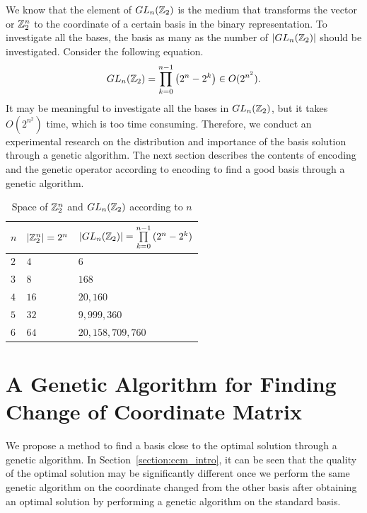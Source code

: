 We know that the element of $ GL_n(\mathbb{Z}_2) $ is the medium that transforms the vector or $ \mathbb{Z}_2^n $ to the coordinate of a certain basis in the binary representation.
To investigate all the bases, the basis as many as the number of $ \left| GL_n(\mathbb{Z}_2) \right| $ should be investigated.
Consider the following equation.
\[ GL_n(\mathbb{Z}_2) = \prod\limits_{k=0}^{n-1} \left( 2^n - 2^k \right) \in O(2^{n^2}). \]
It may be meaningful to investigate all the bases in $ GL_n(\mathbb{Z}_2) $, but it takes $ O(2^{n^2}) $ time, which is too time consuming.
Therefore, we conduct an experimental research on the distribution and importance of the basis solution through a genetic algorithm.
The next section describes the contents of encoding and the genetic operator according to encoding to find a good basis through a genetic algorithm.

\begin{table}[H]
  \caption{Space of $ \mathbb{Z}_2^n $ and $ GL_n(\mathbb{Z}_2) $ according to $ n $}
  \label{tab:space}
  \begin{tabularx}{0.45\textwidth}{C{0.05\textwidth} R{0.1\textwidth} Z}
    \toprule
    $ n $  &  $ | \mathbb{Z}_2^n | = 2^n $  &  $ | GL_n(\mathbb{Z}_2) | = \prod\limits_{k=0}^{n-1}{(2^n - 2^k)} $  \\
    \midrule
    $ 2 $  &  $  4  $  &  $ 6 $                      \\
    $ 3 $  &  $  8  $  &  $ 168 $                    \\
    $ 4 $  &  $ 16  $  &  $ 20,160 $                 \\
    $ 5 $  &  $ 32  $  &  $ 9,999,360 $              \\
    $ 6 $  &  $ 64  $  &  $ 20,158,709,760 $         \\
  \bottomrule
  \end{tabularx}
\end{table}


\section{A Genetic Algorithm for Finding Change of Coordinate Matrix} \label{section:ga_ccm}
We propose a method to find a basis close to the optimal solution through a genetic algorithm.
In Section~\ref{section:ccm_intro}, it can be seen that the quality of the optimal solution may be significantly different once we perform the same genetic algorithm on the coordinate changed from the other basis after obtaining an optimal solution by performing a genetic algorithm on the standard basis.

